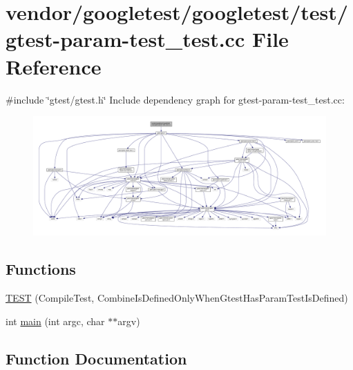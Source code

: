 \hypertarget{gtest-param-test__test_8cc}{}\section{vendor/googletest/googletest/test/gtest-\/param-\/test\+\_\+test.cc File Reference}
\label{gtest-param-test__test_8cc}
{\ttfamily \#include \char`\"{}gtest/gtest.\+h\char`\"{}}\newline
Include dependency graph for gtest-\/param-\/test\+\_\+test.cc\+:
\nopagebreak
\begin{figure}[H]
\begin{center}
\leavevmode
\includegraphics[width=350pt]{gtest-param-test__test_8cc__incl}
\end{center}
\end{figure}
\subsection*{Functions}
\begin{DoxyCompactItemize}
\item 
\hyperlink{gtest-param-test__test_8cc_a1cb6d3685e954ff9880974422039b2b0}{T\+E\+ST} (Compile\+Test, Combine\+Is\+Defined\+Only\+When\+Gtest\+Has\+Param\+Test\+Is\+Defined)
\item 
int \hyperlink{gtest-param-test__test_8cc_a3c04138a5bfe5d72780bb7e82a18e627}{main} (int argc, char $\ast$$\ast$argv)
\end{DoxyCompactItemize}


\subsection{Function Documentation}
\mbox{\label{gtest-param-test__test_8cc_a3c04138a5bfe5d72780bb7e82a18e627}} 
